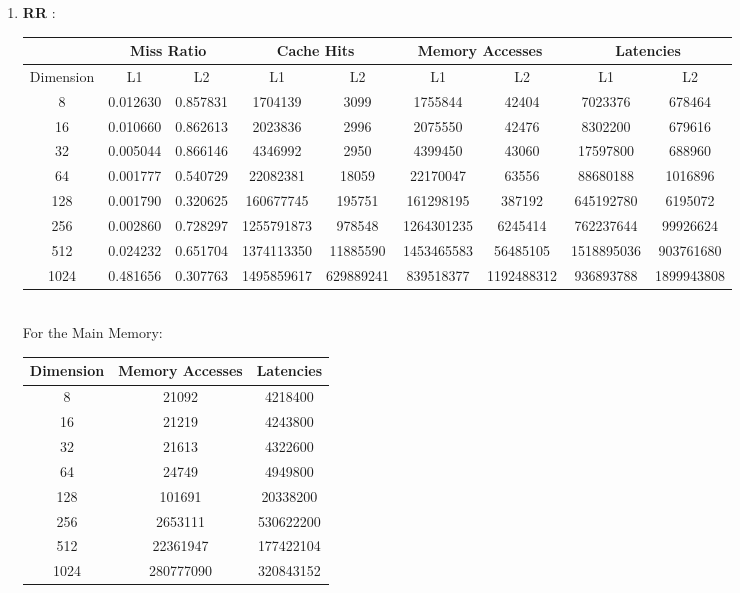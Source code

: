 \documentclass{article}
\begin{document}
\begin{enumerate}
\item \textbf{ RR }:\\

\begin{tabular}{ |c|c|c|c|c|c|c|c|c| }
\hline
& \multicolumn{2}{|c|}{Miss Ratio} & \multicolumn{2}{|c|}{Cache Hits} & \multicolumn{2}{|c|}{Memory Accesses} & \multicolumn{2}{|c|}{Latencies} \\  \hline
Dimension & L1 & L2 & L1 & L2 & L1 & L2 & L1 & L2 \\  \hline
8  &  0.012630 & 0.857831 &  1704139 & 3099 &  1755844 & 42404 &  7023376 & 678464 \\ \hline
16  &  0.010660 & 0.862613 &  2023836 & 2996 &  2075550 & 42476 &  8302200 & 679616 \\ \hline
32  &  0.005044 & 0.866146 &  4346992 & 2950 &  4399450 & 43060 &  17597800 & 688960 \\ \hline
64  &  0.001777 & 0.540729 &  22082381 & 18059 &  22170047 & 63556 &  88680188 & 1016896 \\ \hline
128  &  0.001790 & 0.320625 &  160677745 & 195751 &  161298195 & 387192 &  645192780 & 6195072 \\ \hline
256  &  0.002860 & 0.728297 &  1255791873 & 978548 &  1264301235 & 6245414 &  762237644 & 99926624 \\ \hline
512  &  0.024232 & 0.651704 &  1374113350 & 11885590 &  1453465583 & 56485105 &  1518895036 & 903761680 \\ \hline
1024  &  0.481656 & 0.307763 &  1495859617 & 629889241 &  839518377 & 1192488312 &  936893788 & 1899943808 \\ \hline
\end{tabular}\\

For the Main Memory:\\

\begin{tabular}{ |c|c|c| }
\hline
Dimension & Memory Accesses & Latencies \\  \hline
8 & 21092 & 4218400 \\ \hline
16 & 21219 & 4243800 \\ \hline
32 & 21613 & 4322600 \\ \hline
64 & 24749 & 4949800 \\ \hline
128 & 101691 & 20338200 \\ \hline
256 & 2653111 & 530622200 \\ \hline
512 & 22361947 & 177422104 \\ \hline
1024 & 280777090 & 320843152 \\ \hline
\end{tabular}\\\\
\end{enumerate}
\end{document}
